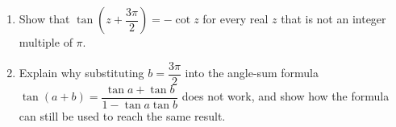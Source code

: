 \begin{enumerate}
\item[(a)] Show that $\tan\left(z+\dfrac{3\pi}{2}\right)=-\cot z$ for every real $z$ that is not an integer multiple of $\pi$.
\item[(b)] Explain why substituting $b=\dfrac{3\pi}{2}$ into the angle-sum formula $\tan(a+b)=\dfrac{\tan a+\tan b}{1-\tan a\tan b}$ does not work, and show how the formula can still be used to reach the same result.
\end{enumerate}
